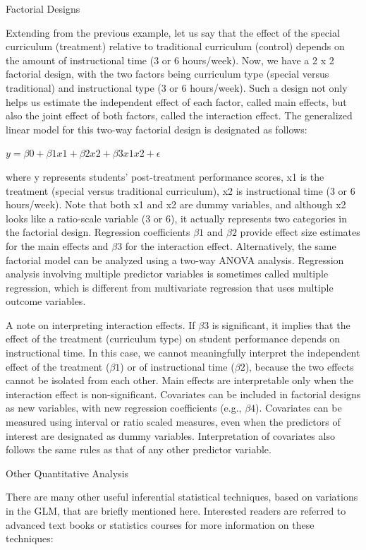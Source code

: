 Factorial Designs

Extending from the previous example, let us say that the effect of the special curriculum (treatment) relative to traditional curriculum (control) depends on the amount of instructional time (3 or 6 hours/week). Now, we have a 2 x 2 factorial design, with the two factors being curriculum type (special versus traditional) and instructional type (3 or 6 hours/week). Such a design not only helps us estimate the independent effect of each factor, called main effects, but also the joint effect of both factors, called the interaction effect. The generalized linear model for this two-way factorial design is designated as follows:

$ y = \beta0 + \beta1 x1 + \beta2 x2 + \beta3 x1 x2 + \epsilon $

where y represents students' post-treatment performance scores, x1 is the treatment (special versus traditional curriculum), x2 is instructional time (3 or 6 hours/week). Note that both x1 and x2 are dummy variables, and although x2 looks like a ratio-scale variable (3 or 6), it actually represents two categories in the factorial design. Regression coefficients $ \beta1 $ and $ \beta2 $ provide effect size estimates for the main effects and $ \beta3 $ for the interaction effect. Alternatively, the same factorial model can be analyzed using a two-way ANOVA analysis. Regression analysis involving multiple predictor variables is sometimes called multiple regression, which is different from multivariate regression that uses multiple outcome variables. 

A note on interpreting interaction effects. If $ \beta3 $ is significant, it implies that the effect of the treatment (curriculum type) on student performance depends on instructional time. In this case, we cannot meaningfully interpret the independent effect of the treatment ($ \beta1 $) or of instructional time ($ \beta2 $), because the two effects cannot be isolated from each other. Main effects are interpretable only when the interaction effect is non-significant. Covariates can be included in factorial designs as new variables, with new regression coefficients (e.g., $ \beta4 $). Covariates can be measured using interval or ratio scaled measures, even when the predictors of interest are designated as dummy variables. Interpretation of covariates also follows the same rules as that of any other predictor variable.

Other Quantitative Analysis

There are many other useful inferential statistical techniques, based on variations in the GLM, that are briefly mentioned here. Interested readers are referred to advanced text books or statistics courses for more information on these techniques:

